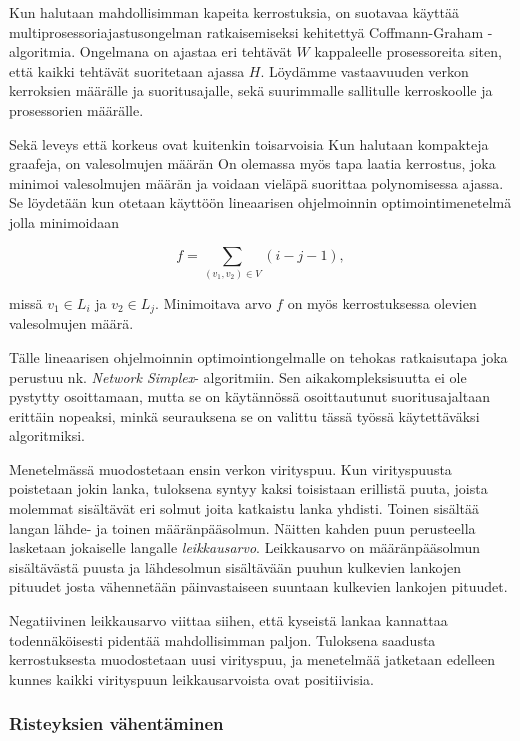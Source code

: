 \documentclass[finnish,12pt]{article}
\begin{document}
Kun halutaan mahdollisimman kapeita kerrostuksia, on suotavaa käyttää multiprosessoriajastusongelman ratkaisemiseksi kehitettyä Coffmann-Graham -algoritmia. \cite{RefWorks:59}
Ongelmana on ajastaa eri tehtävät $W$ kappaleelle prosessoreita siten, että kaikki tehtävät suoritetaan ajassa $H$.
Löydämme vastaavuuden verkon kerroksien määrälle ja suoritusajalle, sekä suurimmalle sallitulle kerroskoolle ja prosessorien määrälle.

Sekä leveys että korkeus ovat kuitenkin toisarvoisia
Kun halutaan kompakteja graafeja, on valesolmujen määrän 
On olemassa myös tapa laatia kerrostus, joka minimoi valesolmujen määrän ja voidaan vieläpä suorittaa polynomisessa ajassa.
Se löydetään kun otetaan käyttöön lineaarisen ohjelmoinnin optimointimenetelmä jolla minimoidaan

$$f=\displaystyle\sum\limits_{(v_1,v_2) \in V} (i - j - 1),$$

missä $v_1 \in L_i$ ja $v_2 \in L_j$. Minimoitava arvo $f$ on myös kerrostuksessa olevien valesolmujen määrä.

Tälle lineaarisen ohjelmoinnin optimointiongelmalle on tehokas ratkaisutapa joka perustuu nk. \emph{Network Simplex}- algoritmiin\cite{RefWorks:28}. Sen aikakompleksisuutta ei ole pystytty osoittamaan, mutta se on käytännössä osoittautunut suoritusajaltaan erittäin nopeaksi, minkä seurauksena se on valittu tässä työssä käytettäväksi algoritmiksi.

Menetelmässä muodostetaan ensin verkon virityspuu.
Kun virityspuusta poistetaan jokin lanka, tuloksena syntyy kaksi toisistaan erillistä puuta, joista molemmat sisältävät eri solmut joita katkaistu lanka yhdisti.
Toinen sisältää langan lähde- ja toinen määränpääsolmun.
Näitten kahden puun perusteella lasketaan jokaiselle langalle \emph{leikkausarvo}.
Leikkausarvo on määränpääsolmun sisältävästä puusta ja lähdesolmun sisältävään puuhun kulkevien lankojen pituudet
josta vähennetään päinvastaiseen suuntaan kulkevien lankojen pituudet.

Negatiivinen leikkausarvo viittaa siihen, että kyseistä lankaa kannattaa todennäköisesti pidentää mahdollisimman paljon.
Tuloksena saadusta kerrostuksesta muodostetaan uusi virityspuu, ja menetelmää jatketaan edelleen kunnes kaikki virityspuun leikkausarvoista ovat positiivisia.

		\subsubsection{Risteyksien vähentäminen}
\end{document}
